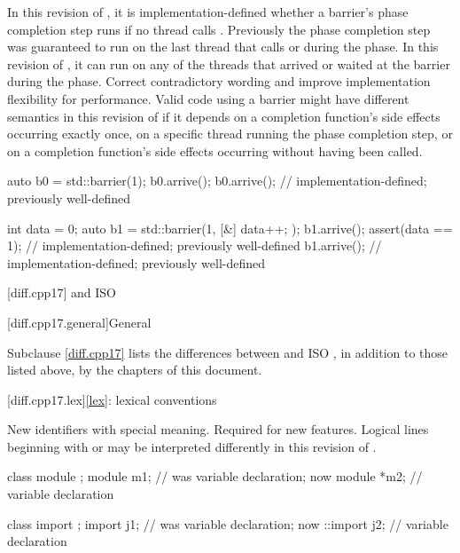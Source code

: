 \change
In this revision of \Cpp{},
it is implementation-defined whether a barrier's phase completion step runs
if no thread calls .
Previously the phase completion step was guaranteed to run on the last thread that calls  or  during the phase.
In this revision of \Cpp{},
it can run on any of the threads that arrived or waited at the barrier
during the phase.
\rationale
Correct contradictory wording and
improve implementation flexibility for performance.
\effect
Valid \CppXX{} code using a barrier might have
different semantics in this revision of \Cpp{}
if it depends on a completion function's side effects occurring exactly once,
on a specific thread running the phase completion step, or
on a completion function's side effects occurring
without  having been called.
\begin{example}
\begin{codeblock}
auto b0 = std::barrier(1);
b0.arrive();
b0.arrive();            // implementation-defined; previously well-defined

int data = 0;
auto b1 = std::barrier(1, [&] { data++; });
b1.arrive();
assert(data == 1);      // implementation-defined; previously well-defined
b1.arrive();            // implementation-defined; previously well-defined
\end{codeblock}
\end{example}

[diff.cpp17]{\Cpp{} and ISO \CppXVII{}}

[diff.cpp17.general]{General}

\pnum
{}%
Subclause \ref{diff.cpp17} lists the differences between \Cpp{} and
ISO \CppXVII{},
in addition to those listed above,
by the chapters of this document.

[diff.cpp17.lex]{\ref*{lex}: lexical conventions}

\change
New identifiers with special meaning.
\rationale
Required for new features.
\effect
Logical lines beginning with
 or  may
be interpreted differently
in this revision of \Cpp{}.
\begin{example}
\begin{codeblock}
class module {};
module m1;          // was variable declaration; now 
module *m2;         // variable declaration

class import {};
import j1;          // was variable declaration; now 
::import j2;        // variable declaration
\end{codeblock}
\end{example}

